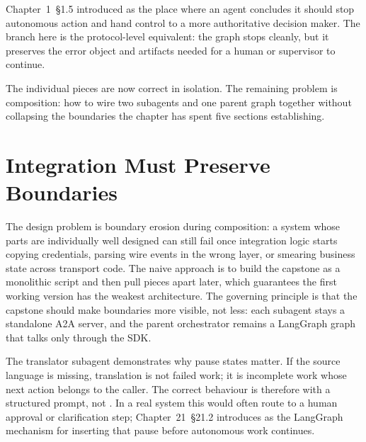 \begin{notebox}
Chapter~1~\S1.5 introduced  as the place where an agent
concludes it should stop autonomous action and hand control to a more
authoritative decision maker. The  branch here is the
protocol-level equivalent: the graph stops cleanly, but it preserves the
error object and artifacts needed for a human or supervisor to continue.
\end{notebox}

The individual pieces are now correct in isolation. The remaining problem
is composition: how to wire two subagents and one parent graph together
without collapsing the boundaries the chapter has spent five sections
establishing.


\section{Integration Must Preserve Boundaries}
\label{sec:a2a-integration}

The design problem is boundary erosion during composition: a system whose
parts are individually well designed can still fail once integration logic
starts copying credentials, parsing wire events in the wrong layer, or
smearing business state across transport code. The naive approach is to
build the capstone as a monolithic script and then pull pieces apart
later, which guarantees the first working version has the weakest
architecture. The governing principle is that the capstone should make
boundaries more visible, not less: each subagent stays a standalone A2A
server, and the parent orchestrator remains a LangGraph graph that talks
only through the SDK.

The translator subagent demonstrates why pause states matter. If the
source language is missing, translation is not failed work; it is
incomplete work whose next action belongs to the caller. The correct
behaviour is therefore  with a structured
 prompt, not . In a real system this would
often route to a human approval or clarification step; Chapter~21~\S21.2
introduces  as the LangGraph mechanism for inserting
that pause before autonomous work continues.

